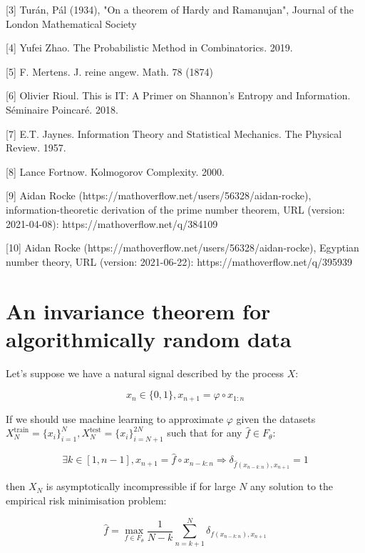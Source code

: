 \documentclass{article}
\begin{document}
[3] Turán, Pál (1934), "On a theorem of Hardy and Ramanujan", Journal of the London Mathematical Society

[4] Yufei Zhao. The Probabilistic Method in Combinatorics. 2019.

[5] F. Mertens. J. reine angew. Math. 78 (1874)

[6] Olivier Rioul. This is IT: A Primer on Shannon’s Entropy and Information. Séminaire Poincaré. 2018.

[7] E.T. Jaynes. Information Theory and Statistical Mechanics. The Physical Review. 1957.

[8] Lance Fortnow. Kolmogorov Complexity. 2000.

[9] Aidan Rocke (https://mathoverflow.net/users/56328/aidan-rocke), information-theoretic derivation of the prime number theorem, URL (version: 2021-04-08): https://mathoverflow.net/q/384109

[10] Aidan Rocke (https://mathoverflow.net/users/56328/aidan-rocke), Egyptian number theory, URL (version: 2021-06-22): https://mathoverflow.net/q/395939

\newpage 

\appendix

\section{An invariance theorem for algorithmically random data}

Let's suppose we have a natural signal described by the process $X$: 

\begin{equation}
x_n \in \{0,1\}, x_{n+1} = \varphi \circ x_{1:n}	
\end{equation}

If we should use machine learning to approximate $\varphi$ given the datasets 
$X_N^{\text{train}}= \{x_i\}_{i=1}^N,X_N^{\text{test}}= \{x_i\}_{i=N+1}^{2N}$
such that for any $\hat{f} \in F_{\theta}$: 

\begin{equation}
\exists k \in [1,n-1], x_{n+1} = \hat{f} \circ x_{n-k:n} \Rightarrow \delta_{\hat{f}(x_{n-k:n}),x_{n+1}} = 1	
\end{equation}

then $X_N$ is asymptotically incompressible if for large $N$ any solution to the 
empirical risk minimisation problem: 

\begin{equation}
\hat{f} = \max_{f \in F_{\theta}} \frac{1}{N-k} \sum_{n=k+1}^N \delta_{f(x_{n-k:n}),x_{n+1}}
\end{equation}
\end{document}
